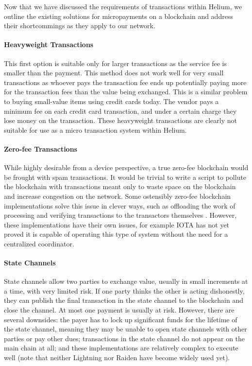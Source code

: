 \documentclass[10pt, nonatbib, nocopyrightspace, reprint]{sigplanconf}
\begin{document}
Now that we have discussed the requirements of transactions within Helium, we outline the existing solutions for micropayments on a blockchain and address their shortcommings as they apply to our network.

\paragraph{Heavyweight Transactions}
This first option is suitable only for larger transactions as the service fee is smaller than the payment. This method does not work well for very small transactions as whoever pays the transaction fee ends up potentially paying more for the transaction fees than the value being exchanged. This is a similar problem to buying small-value items using credit cards today. The vendor pays a minimum fee on each credit card transaction, and under a certain charge they lose money on the transaction. These heavyweight transactions are clearly not suitable for use as a micro transaction system within Helium.

\paragraph{Zero-fee Transactions}
While highly desirable from a device perspective, a true zero-fee blockchain would be frought with spam transactions. It would be trivial to write a script to pollute the blockchain with transactions meant only to waste space on the blockchain and increase congestion on the network. Some ostensibly zero-fee blockchain implementations solve this issue in clever ways, such as offloading the work of processing and verifying transactions to the transactors themselves \cite{iota}. However, these implementations have their own issues, for example IOTA has not yet proved it is capable of operating this type of system without the need for a centralized coordinator.

\paragraph{State Channels}
State channels \cite{state-channels} allow two parties to exchange value, usually in small increments at a time, with very limited risk. If one party thinks the other is acting dishonestly, they can publish the final transaction in the state channel to the blockchain and close the channel. At most one payment is usually at risk. However, there are several downsides: the payer has to lock up significant funds for the lifetime of the state channel, meaning they may be unable to open state channels with other parties or pay other dues; transactions in the state channel do not appear on the main chain at all; and these implementations are relatively complex to execute well (note that neither Lightning \cite{lightning} nor Raiden \cite{raiden} have become widely used yet).
\end{document}
